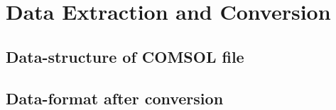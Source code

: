\chapter{Data Extraction and Conversion}
\section{Data-structure of COMSOL file}
\section{Data-format after conversion}